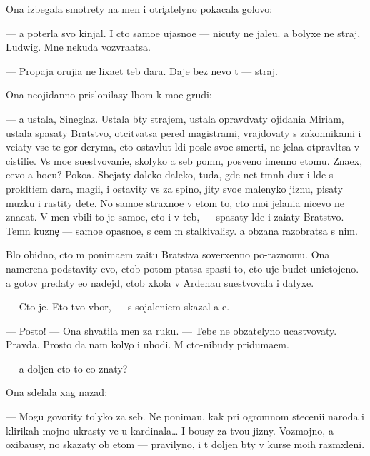 \documentclass[10pt]{book}
\begin{document}
Ona izbegala smotrety na men{\ia} i otri{\c}atelyno pokacala golovo{\y}:

— {\Y}a poter{\ia}la svo{\y} kinjal. I cto samo{\y}e ujasno{\y}e — nicuty ne jale{\y}u. {\Y}a bolyxe ne straj, Ludwig. Mne nekuda vozvra{\x}atsa.

— Propaja oruji{\y}a ne lixa{\y}et teb{\ia} dara. Daje bez nevo t{\yi} — straj.

Ona neojidanno prislonilasy lbom k mo{\y}e{\y} grudi:

— {\Y}a ustala, Sineglaz{\yi}{\y}. Ustala b{\yi}ty strajem, ustala opravd{\yi}vaty ojidani{\y}a Miriam, ustala spasaty Bratstvo, otcit{\yi}vatsa pered magistrami, vrajdovaty s zakonnikami i v{\yi}ci{\x}aty vse te gor{\yi} deryma, cto ostavl{\ia}{\y}ut l{\iu}di posle svo{\y}e{\y} smerti, ne jela{\y}a otpravl{\ia}tsa v cistili{\x}e. Vs{\e} mo{\y}e su{\x}estvovani{\y}e, skolyko {\y}a seb{\ia} pomn{\iu}, posv{\ia}{\x}eno imenno etomu. Zna{\y}ex, cevo {\y}a hocu? Poko{\y}a. Sbejaty daleko-daleko, tuda, gde net t{\e}mn{\yi}h dux i l{\iu}de{\y} s prokl{\ia}ti{\y}em dara, magi{\y}i, i ostavity vs{\e} za spino{\y}, jity svo{\y}e{\y} malenyko{\y} jizn{\y}u, pisaty muz{\yi}ku i rastity dete{\y}. No samo{\y}e straxno{\y}e v etom to, cto mo{\y}i jelani{\y}a nicevo ne znacat. V men{\ia} vbili to je samo{\y}e, cto i v teb{\ia}, — spasaty l{\iu}de{\y} i za{\x}i{\x}aty Bratstvo. Temn{\yi}{\y} kuzne{\c} — samo{\y}e opasno{\y}e, s cem m{\yi} stalkivalisy. {\Y}a ob{\ia}zana razobratsa s nim.

B{\yi}lo obidno, cto m{\yi} ponima{\y}em za{\x}itu Bratstva soverxenno po-raznomu. Ona namerena podstavity {\y}evo, ctob{\yi} potom p{\yi}tatsa spasti to, cto uje budet unictojeno. {\Y}a gotov predaty {\y}e{\y}o nadejd{\yi}, ctob{\yi} xkola v Ardenau su{\x}estvovala i dalyxe.

— Cto je. Eto tvo{\y} v{\yi}bor, — s sojaleni{\y}em skazal {\y}a {\y}e{\y}.

— Posto{\y}! — Ona shvatila men{\ia} za ruku. — Tebe ne ob{\ia}zatelyno ucastvovaty. Pravda. Prosto da{\y} nam koly{\c}o i uhodi. M{\yi} cto-nibudy priduma{\y}em.

— {\Y}a doljen cto-to {\y}e{\x}o znaty?

Ona sdelala xag nazad:

— Mogu govority tolyko za seb{\ia}. Ne ponima{\y}u, kak pri ogromnom steceni{\y}i naroda i klirikah mojno ukrasty ve{\x} u kardinala… I bo{\y}usy za tvo{\y}u jizny. Vozmojno, {\y}a oxiba{\y}usy, no skazaty ob etom — pravilyno, i t{\yi} doljen b{\yi}ty v kurse mo{\y}ih razm{\yi}xleni{\y}.
\end{document}
